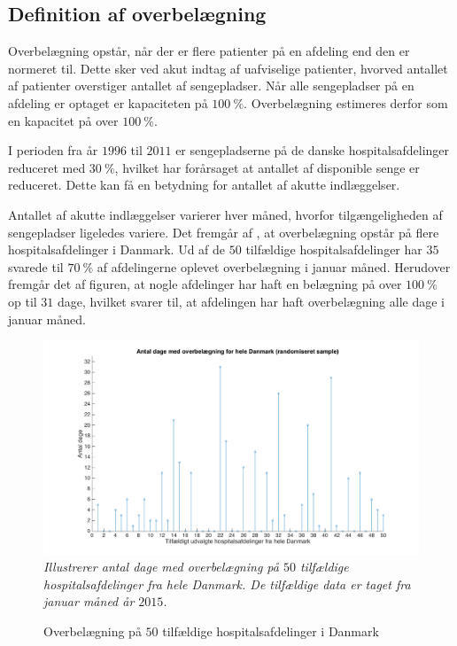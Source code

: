 \subsection{Definition af overbelægning}
Overbelægning opstår, når der er flere patienter på en afdeling end den er normeret til.\cite{Heidmann2014} Dette sker ved akut indtag af uafviselige patienter, hvorved antallet af patienter overstiger antallet af sengepladser. 
Når alle sengepladser på en afdeling er optaget er kapaciteten på $100~\%$. Overbelægning estimeres derfor som en kapacitet på over $100~\%$.

I perioden fra år $1996$ til $2011$ er sengepladserne på de danske hospitalsafdelinger reduceret med $30~\%$, hvilket har forårsaget at antallet af disponible senge er reduceret. Dette kan få en betydning for antallet af akutte indlæggelser.\cite{Madsen2014}

Antallet af akutte indlæggelser varierer hver måned, hvorfor tilgængeligheden af sengepladser ligeledes variere. Det fremgår af , at overbelægning opstår på flere hospitalsafdelinger i Danmark. Ud af de $50$ tilfældige hospitalsafdelinger har $35$ svarede til $70~\%$ af afdelingerne oplevet overbelægning i januar måned. Herudover fremgår det af figuren, at nogle afdelinger har haft en belægning på over $100~\%$ op til $31$ dage, hvilket svarer til, at afdelingen har haft overbelægning alle dage i januar måned.\cite{SDS2015}

\begin{figure}[H]
	\flushleft 
	\caption{Overbelægning på $50$ tilfældige hospitalsafdelinger i Danmark}
	\centering
	\includegraphics[scale=.3]{figures/overbelaegning_ran}
	\label{overbelaegning_ran}
	\flushleft
	\textit{Illustrerer antal dage med overbelægning på $50$ tilfældige hospitalsafdelinger fra hele Danmark. De tilfældige data er taget fra januar måned år $2015$. \cite{SDS2015}}
\end{figure}

